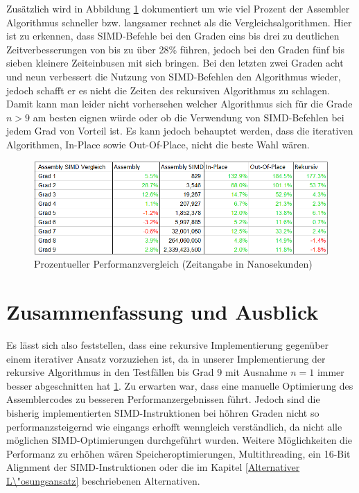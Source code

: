 \documentclass[course=asp]{aspdoc}
\begin{document}
Zus\"atzlich wird in Abbildung \ref{Abb: Tabelle Performanz} dokumentiert um wie viel Prozent der Assembler Algorithmus schneller bzw. langsamer rechnet als die Vergleichsalgorithmen. Hier ist zu erkennen, dass SIMD-Befehle bei den Graden eins bis drei zu deutlichen Zeitverbesserungen von bis zu \"uber 28\% f\"uhren, jedoch bei den Graden f\"unf bis sieben kleinere Zeiteinbusen mit sich bringen. Bei den letzten zwei Graden acht und neun verbessert die Nutzung von SIMD-Befehlen den Algorithmus wieder, jedoch schafft er es nicht die Zeiten des rekursiven Algorithmus zu schlagen.
Damit kann man leider nicht vorhersehen welcher Algorithmus sich f\"ur die Grade $n > 9$ am besten eignen w\"urde oder ob die Verwendung von SIMD-Befehlen bei jedem Grad von Vorteil ist. Es kann jedoch behauptet werden, dass die iterativen Algorithmen, In-Place sowie Out-Of-Place, nicht die beste Wahl w\"aren.

\begin{figure}[ht]
\centering
\includegraphics[scale = 0.65]{zeitmessungenProzent.png}
\caption{Prozentueller Performanzvergleich (Zeitangabe in Nanosekunden)}\label{Abb: Tabelle Performanz}
\captionsetup[figure]{font=small,labelfont=small}
\end{figure}

\newpage
\section{Zusammenfassung und Ausblick} \label{Zusammenfassung und Ausblick}
Es l\"asst sich also feststellen, dass eine rekursive Implementierung gegen\"uber einem iterativer Ansatz vorzuziehen ist, da in unserer Implementierung der rekursive Algorithmus in den Testf\"allen bis Grad 9 mit Ausnahme $n = 1$ immer besser abgeschnitten hat \ref{Abb: Tabelle Performanz}. Zu erwarten war, dass eine manuelle Optimierung des Assemblercodes zu besseren Performanzergebnissen f\"uhrt. Jedoch sind die bisherig implementierten SIMD-Instruktionen bei h\"ohren Graden nicht so performanzsteigernd wie eingangs erhofft wenngleich verst\"andlich, da nicht alle m\"oglichen SIMD-Optimierungen durchgef\"uhrt wurden. Weitere M\"oglichkeiten die Performanz zu erh\"ohen w\"aren Speicheroptimierungen, Multithreading, ein 16-Bit Alignment der SIMD-Instruktionen oder die im Kapitel \ref{Alternativer L\"osungsansatz} beschriebenen Alternativen.
\end{document}
